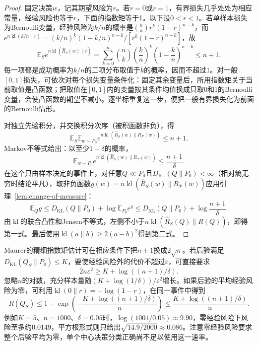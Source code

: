 \begin{proof}
固定决策$w$，记其期望风险为$r$。若$r=0$或$r=1$，有界损失几乎处处为相应常量，经验风险也等于$r$，下面的指数矩等于1。以下设$0<r<1$。若单样本损失为Bernoulli变量，经验风险为$k/n$的概率是$\binom nk r^k(1-r)^{n-k}$，而$e^{n\operatorname{kl}(k/n\|r)}=(k/n)^k(1-k/n)^{n-k}/[r^k(1-r)^{n-k}]$，故
\[
 \mathbb E_S e^{n\operatorname{kl}(\hat R_S(w)\|r)}
 =\sum_{k=0}^n\binom nk\left(\frac kn\right)^k\left(1-\frac kn\right)^{n-k}\leq n+1.
\]
每一项都是成功概率为$k/n$的二项分布取值于$k$的概率，因而不超过1。对一般$[0,1]$损失，可依次对每个损失变量条件化：固定其余变量后，所用指数矩关于当前取值是凸函数；把取值在$[0,1]$内的变量按其条件均值换成只取0和1的Bernoulli变量，会使凸函数的期望不减小。逐坐标重复这一步，便把一般有界损失化为前面的Bernoulli情形。

对独立先验积分，并交换积分次序（被积函数非负），得
\[
 \mathbb E_S\mathbb E_{w\sim P_0}e^{n\operatorname{kl}(\hat R_S(w)\|R_{\mathcal P}(w))}\leq n+1.
\]
Markov不等式给出：以至少$1-\delta$的概率，
\[
 \mathbb E_{w\sim P_0}e^{n\operatorname{kl}(\hat R_S(w)\|R_{\mathcal P}(w))}\leq\frac{n+1}{\delta}.
\]
在这个只由样本决定的事件上，对任意$Q\ll P_0$且$D_{\mathrm{KL}}(Q\|P_0)<\infty$（相对熵无穷时结论平凡），取非负函数$g(w)=n\operatorname{kl}(\hat R_S(w)\|R_{\mathcal P}(w))$应用引理~\ref{lem:change-of-measure}：
\begin{equation}
 \mathbb E_Q g\leq D_{\mathrm{KL}}(Q\|P_0)+\log\mathbb E_{P_0}e^g\leq D_{\mathrm{KL}}(Q\|P_0)+\log\frac{n+1}\delta.
 \label{eq:change-of-measure}
\end{equation}
由$\operatorname{kl}$的联合凸性和Jensen不等式，左侧不小于$n\operatorname{kl}(\hat R_S(Q)\|R(Q))$，即得第一式。最后使用$\operatorname{kl}(a\|b)\geq2(a-b)^2$得到第二式。
\end{proof}

Maurer的精细指数矩估计可在相应条件下把$n+1$换成$2\sqrt n$。若后验满足$D_{\mathrm{KL}}(Q_S\|P_0)\leq K$，要使经验风险外的代价不超过$\varepsilon$，可直接要求
\begin{equation}
 2n\varepsilon^2\geq K+\log((n+1)/\delta).
 \label{eq:pac-bayes-sample-requirement}
\end{equation}
忽略$n$的对数，充分样本量随$(K+\log(1/\delta))/\varepsilon^2$增长。如果后验的平均经验风险为零，可利用$\operatorname{kl}(0\|r)=-\log(1-r)$，在同一事件中得到
\[
 R(Q_S)\leq1-\exp\left(-\frac{K+\log((n+1)/\delta)}n\right)\leq\frac{K+\log((n+1)/\delta)}n.
\]
例如$K=5$、$n=1000$、$\delta=0.05$时，$\log(1001/0.05)\approx9.90$，零经验风险下风险至多约$0.0149$，平方根形式则只给出$\sqrt{14.9/2000}\approx0.086$。注意零经验风险要求整个后验平均为零，单个中心决策分类正确尚不足以使用这一速率。

